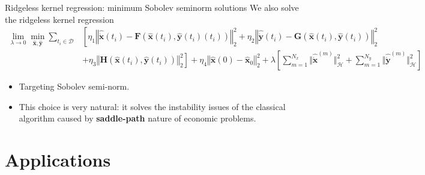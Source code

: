 \documentclass[aspectratio=169,10pt]{beamer}
\newcommand{\emphcolor}[1]{\textbf{\textcolor{emphcolorval}{#1}}}
\begin{document}
\begin{frame}{Ridgeless kernel regression: minimum Sobolev seminorm solutions}
We also solve the ridgeless kernel regression 
\begin{align*}
	\lim_{\lambda\rightarrow 0} \min_{\hat{\mathbf{x}}, \hat{\mathbf{y}}} \sum_{t_i \in \mathcal{D}} &\left[\eta_1 \left\Vert \hat{\dot{\mathbf{x}}}(t_i) 
	- \mathbf{F}(\hat{\mathbf{x}}(t_i), \hat{\mathbf{y}}(t_i)(t_i)) \right\Vert_2^2 + \eta_2 \left\Vert \hat{\dot{\mathbf{y}}}(t_i) -  \mathbf{G}(\hat{\mathbf{x}}(t_i), \hat{\mathbf{y}}(t_i)) \right\Vert_2^2\right.\nonumber\\
	&\left.+ \eta_3 \left\Vert \mathbf{H}(\hat{\mathbf{x}}(t_i), \hat{\mathbf{y}}(t_i)) \right\Vert_2^2 \right] + \eta_4 \left\Vert \hat{\mathbf{x}}(0) - \hat{\mathbf{x}}_0 \right\Vert_2^2 + \lambda \left[\sum_{m=1}^{N_x}\Vert \hat{\dot{\mathbf{x}}}^{(m)}\Vert^2_{\mathcal{H}}+ \sum_{m=1}^{N_y}\Vert \hat{\dot{\mathbf{y}}}^{(m)}\Vert^2_{\mathcal{H}}\right]
\end{align*}
\begin{itemize}
	\item Targeting Sobolev semi-norm.
	\vspace{0.1in}
	\item This choice is very natural: it solves the instability issues of the classical algorithm caused by \emphcolor{saddle-path} nature of economic problems.
\end{itemize} 
\end{frame}

\section{Applications}
\end{document}
